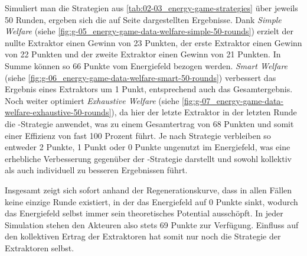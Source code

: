 Simuliert man die Strategien aus \autoref{tab:02-03_energy-game-strategies} über jeweils 50 Runden, ergeben sich die auf Seite \pageref{fig:g-05_energy-game-data-welfare-simple-50-rounds} dargestellten Ergebnisse. Dank \textit{Simple Welfare} (siehe \autoref{fig:g-05_energy-game-data-welfare-simple-50-rounds}) erzielt der nullte Extraktor einen Gewinn von 23 Punkten, der erste Extraktor einen Gewinn von 22 Punkten und der zweite Extraktor einen Gewinn von 21 Punkten. In Summe können so 66 Punkte vom Energiefeld bezogen werden. \textit{Smart Welfare} (siehe \autoref{fig:g-06_energy-game-data-welfare-smart-50-rounds}) verbessert das Ergebnis eines Extraktors um 1 Punkt, entsprechend auch das Gesamtergebnis. Noch weiter optimiert \textit{Exhaustive Welfare} (siehe \autoref{fig:g-07_energy-game-data-welfare-exhaustive-50-rounds}), da hier der letzte Extraktor in der letzten Runde die -Strategie anwendet, was zu einem Gesamtertrag von 68 Punkten und somit einer Effizienz von fast 100 Prozent führt. Je nach Strategie verbleiben so entweder 2 Punkte, 1 Punkt oder 0 Punkte ungenutzt im Energiefeld, was eine erhebliche Verbesserung gegenüber der -Strategie darstellt und sowohl kollektiv als auch individuell zu besseren Ergebnissen führt.




Insgesamt zeigt sich sofort anhand der Regenerationskurve, dass in allen Fällen keine einzige Runde existiert, in der das Energiefeld auf 0 Punkte sinkt, wodurch das Energiefeld selbst immer sein theoretisches Potential ausschöpft. In jeder Simulation stehen den Akteuren also stets 69 Punkte zur Verfügung. Einfluss auf den kollektiven Ertrag der Extraktoren hat somit nur noch die Strategie der Extraktoren selbst.

